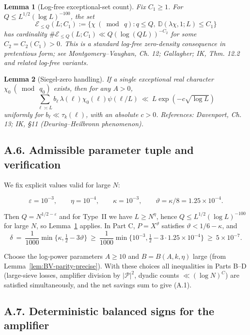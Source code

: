 \documentclass[11pt]{article}
\newtheorem{lemma}{Lemma}[section]
\theoremstyle{definition}
\theoremstyle{remark}
\begin{document}
\begin{lemma}[Log-free exceptional-set count]\label{lem:logfree-density}
	Fix $C_1\ge 1$. For $Q\le L^{1/2}(\log L)^{-100}$, the set
	\[
		\mathcal E_{\le Q}(L;C_1):=\{\chi\ (\bmod\ q): q\le Q,\ \mathbb D(\lambda\chi,1;L)\le C_1\}
	\]
	has cardinality $\#\mathcal E_{\le Q}(L;C_1)\ll Q(\log (QL))^{-C_2}$ for some $C_2=C_2(C_1)>0$. This is a standard log-free zero-density consequence in pretentious form; see Montgomery--Vaughan, Ch. 12; Gallagher; IK, Thm. 12.2 and related log-free variants.
\end{lemma}

\begin{lemma}[Siegel-zero handling]\label{lem:siegel}
	If a single exceptional real character $\chi_0\ (\bmod\ q_0)$ exists, then for any $A>0$,
	\[
		\sum_{\ell\asymp L} b_\ell\,\lambda(\ell)\chi_0(\ell)\psi(\ell/L)\ \ll\ L\exp(-c\sqrt{\log L})
	\]
	uniformly for $b_\ell\ll \tau_k(\ell)$, with an absolute $c>0$. References: Davenport, Ch. 13; IK, §11 (Deuring--Heilbronn phenomenon).
\end{lemma}

\subsection*{A.6. Admissible parameter tuple and verification}

We fix explicit values valid for large $N$:

\[
	\varepsilon=10^{-3},\qquad \eta=10^{-4},\qquad \kappa=10^{-3},\qquad \vartheta=\kappa/8=1.25\times 10^{-4}.
\]

Then $Q=N^{1/2-\varepsilon}$ and for Type~II we have $L\ge N^{\eta}$, hence $Q\le L^{1/2}(\log L)^{-100}$ for large $N$, so Lemma~\ref{lem:logfree-density} applies. In Part C, $P=X^{\vartheta}$ satisfies $\vartheta<1/6-\kappa$, and
\[
	\delta\ =\ \frac1{1000}\min\{\kappa,\tfrac12-3\vartheta\}\ \ge\ \frac{1}{1000}\min\{10^{-3},\tfrac12-3\cdot 1.25\times 10^{-4}\}\ \ge\ 5\times 10^{-7}.
\]

Choose the log-power parameters $A\ge 10$ and $B=B(A,k,\eta)$ large (from Lemma~\ref{lem:BV-parity-precise}). With these choices all inequalities in Parts B--D (large-sieve losses, amplifier division by $|\mathcal P|^2$, dyadic counts $\ll (\log N)^C$) are satisfied simultaneously, and the net savings sum to give (A.1).

\subsection*{A.7. Deterministic balanced signs for the amplifier}
\end{document}
